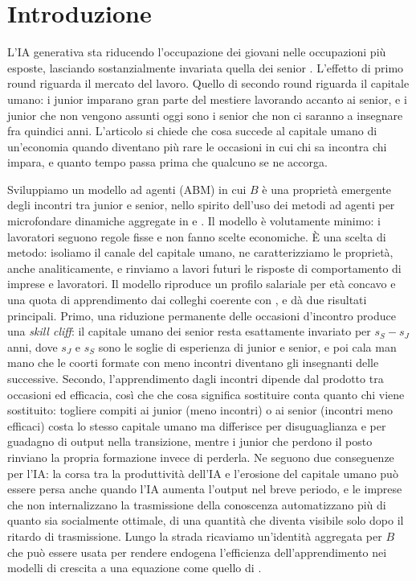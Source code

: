 \documentclass[preprint,12pt,authoryear]{elsarticle}
\begin{document}
\section{Introduzione}

L'IA generativa sta riducendo l'occupazione dei giovani nelle occupazioni più esposte, lasciando sostanzialmente invariata quella dei senior \citep{Brynjolfsson2025,HosseiniLichtinger2025}. L'effetto di primo round riguarda il mercato del lavoro. Quello di secondo round riguarda il capitale umano: i junior imparano gran parte del mestiere lavorando accanto ai senior, e i junior che non vengono assunti oggi sono i senior che non ci saranno a insegnare fra quindici anni. L'articolo si chiede che cosa succede al capitale umano di un'economia quando diventano più rare le occasioni in cui chi sa incontra chi impara, e quanto tempo passa prima che qualcuno se ne accorga.

Sviluppiamo un modello ad agenti (ABM) in cui $B$ è una proprietà emergente degli incontri tra junior e senior, nello spirito dell'uso dei metodi ad agenti per microfondare dinamiche aggregate in \citet{Bassi2022} e \citet{RailsbackGrimm2011}. Il modello è volutamente minimo: i lavoratori seguono regole fisse e non fanno scelte economiche. È una scelta di metodo: isoliamo il canale del capitale umano, ne caratterizziamo le proprietà, anche analiticamente, e rinviamo a lavori futuri le risposte di comportamento di imprese e lavoratori. Il modello riproduce un profilo salariale per età concavo e una quota di apprendimento dai colleghi coerente con \citet{Jarosch2021}, e dà due risultati principali. Primo, una riduzione permanente delle occasioni d'incontro produce una \emph{skill cliff}: il capitale umano dei senior resta esattamente invariato per $s_S - s_J$ anni, dove $s_J$ e $s_S$ sono le soglie di esperienza di junior e senior, e poi cala man mano che le coorti formate con meno incontri diventano gli insegnanti delle successive. Secondo, l'apprendimento dagli incontri dipende dal prodotto tra occasioni ed efficacia, così che che cosa significa sostituire conta quanto chi viene sostituito: togliere compiti ai junior (meno incontri) o ai senior (incontri meno efficaci) costa lo stesso capitale umano ma differisce per disuguaglianza e per guadagno di output nella transizione, mentre i junior che perdono il posto rinviano la propria formazione invece di perderla. Ne seguono due conseguenze per l'IA: la corsa tra la produttività dell'IA e l'erosione del capitale umano può essere persa anche quando l'IA aumenta l'output nel breve periodo, e le imprese che non internalizzano la trasmissione della conoscenza automatizzano più di quanto sia socialmente ottimale, di una quantità che diventa visibile solo dopo il ritardo di trasmissione. Lungo la strada ricaviamo un'identità aggregata per $B$ che può essere usata per rendere endogena l'efficienza dell'apprendimento nei modelli di crescita a una equazione come quello di \citet{Lucas1988}.
\end{document}
